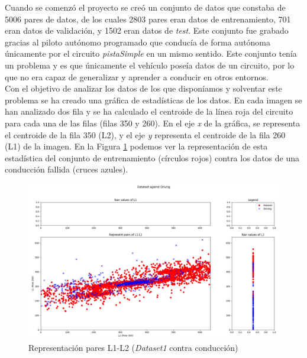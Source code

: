 Cuando se comenzó el proyecto se creó un conjunto de datos que constaba de 5006 pares de datos, de los cuales 2803 pares eran datos de entrenamiento, 701 eran datos de validación, y 1502 eran datos de \textit{test}. Este conjunto fue grabado gracias al piloto autónomo programado que conducía de forma autónoma únicamente por el circuito \textit{pistaSimple} en un mismo sentido. Este conjunto tenía un problema y es que únicamente el vehículo poseía datos de un circuito, por lo que no era capaz de generalizar y aprender a conducir en otros entornos.\\

Con el objetivo de analizar los datos de los que disponíamos y solventar este problema se ha creado una gráfica de estadísticas de los datos. En cada imagen se han analizado dos fila y se ha calculado el centroide de la línea roja del circuito para cada una de las filas (filas 350 y 260). En el eje \textit{x} de la gráfica, se representa el centroide de la fila 350 (L2), y el eje \textit{y} representa el centroide de la fila 260 (L1) de la imagen. En la Figura \ref{fig.L1_L2_dataset1} podemos ver la representación de esta estadística del conjunto de entrenamiento (círculos rojos) contra los datos de una conducción fallida (cruces azules).\\


\begin{figure}
  \begin{center}
    \includegraphics[width=1\textwidth]{figures/Infraestructura/L1_L2_dataset1_driving.png}
		\caption{Representación pares L1-L2 (\textit{Dataset1} contra conducción)}
		\label{fig.L1_L2_dataset1}
		\end{center}
\end{figure}

